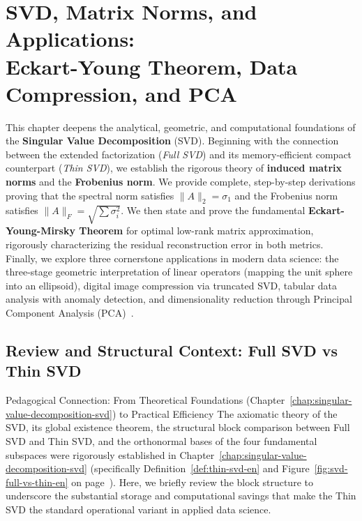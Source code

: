 \chapter[SVD, Matrix Norms, and Applications]{SVD, Matrix Norms, and Applications:\\Eckart-Young Theorem, Data Compression, and PCA}
\label{chap:svd-matrix-norms-applications}

This chapter deepens the analytical, geometric, and computational foundations of the \textbf{Singular Value Decomposition} (SVD). Beginning with the connection between the extended factorization (\textit{Full SVD}) and its memory-efficient compact counterpart (\textit{Thin SVD}), we establish the rigorous theory of \textbf{induced matrix norms} and the \textbf{Frobenius norm}. We provide complete, step-by-step derivations proving that the spectral norm satisfies $\|A\|_2 = \sigma_1$ and the Frobenius norm satisfies $\|A\|_F = \sqrt{\sum \sigma_i^2}$. We then state and prove the fundamental \textbf{Eckart-Young-Mirsky Theorem} for optimal low-rank matrix approximation, rigorously characterizing the residual reconstruction error in both metrics. Finally, we explore three cornerstone applications in modern data science: the three-stage geometric interpretation of linear operators (mapping the unit sphere into an ellipsoid), digital image compression via truncated SVD, tabular data analysis with anomaly detection, and dimensionality reduction through Principal Component Analysis (PCA)~\cite{golub2013matrix,trefethen1997numerical,strang2019linear}.

\FloatBarrier
\section{Review and Structural Context: Full SVD vs Thin SVD}
\label{sec:svd-review-full-thin-en}

\begin{noteblock}{Pedagogical Connection: From Theoretical Foundations (Chapter~\ref{chap:singular-value-decomposition-svd}) to Practical Efficiency}
The axiomatic theory of the SVD, its global existence theorem, the structural block comparison between Full SVD and Thin SVD, and the orthonormal bases of the four fundamental subspaces were rigorously established in Chapter~\ref{chap:singular-value-decomposition-svd} (specifically Definition~\ref{def:thin-svd-en} and Figure~\ref{fig:svd-full-vs-thin-en} on page~\pageref{def:thin-svd-en}).
Here, we briefly review the block structure to underscore the substantial storage and computational savings that make the Thin SVD the standard operational variant in applied data science.
\end{noteblock}

